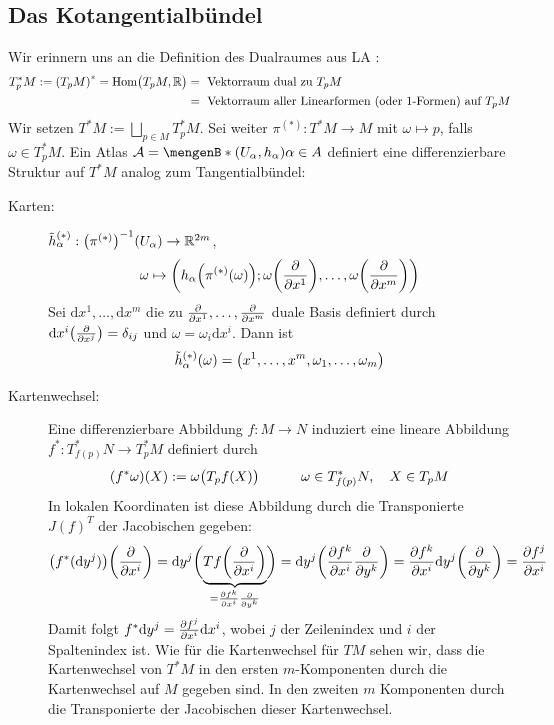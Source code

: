\subsection{Das Kotangentialbündel} %
\label{sub:42}
Wir erinnern uns an die Definition des Dualraumes aus LA :
\begin{align*}
	T_p^* M := \enbrace*{T_pM}^* = \Hom\enbrace[\big]{T_pM, \mathds{R}} &= \text{ Vektorraum dual zu } T_p M  \\
	&= \text{ Vektorraum aller Linearformen (oder 1-Formen) auf } T_pM
\end{align*}
Wir setzen $T^*M := \bigsqcup_{p \in M} T_p^* M$. Sei weiter $\pi^{(*)} : T^*M \to M$ mit $\omega \mapsto p$, falls $\omega \in T_p^* M$. Ein Atlas 
$\mathcal{A} = \set[(U_\alpha, h_\alpha)]{\alpha \in A}$ definiert eine differenzierbare Struktur auf $T^*M$ analog zum Tangentialbündel:
\begin{description}
	\item[Karten:] $\tilde{h}^{(*)}_\alpha : \enbrace*{\pi^{(*)}} ^{-1} (U_\alpha) \to \mathds{R}^{2m}$, 
	\[
		\omega \mapsto \enbrace*{h_\alpha \enbrace*{\pi^{(*)}(\omega)}; \omega \enbrace*{\diff{}{x^1}}, \ldots , \omega \enbrace*{\diff{}{x^m} }   } 
	\]
	Sei $\mathrm{d}x^1, \ldots , \mathrm{d}x^m$ die zu $\diff{}{x^1}, \ldots , \diff{}{x^m}$ duale Basis definiert durch 
	$\mathrm{d}x^i \enbrace*{\diff{}{x^j} } = \delta_{ij} $ und $\omega= \omega_i \mathrm{d}x^i$. Dann ist
	\[
		\tilde{h}_\alpha^{(*)} (\omega) = \enbrace*{x^1, \ldots, x^m, \omega_1, \ldots , \omega_m} 
	\]
	\item[Kartenwechsel:] Eine differenzierbare Abbildung $f : M \to N$ induziert eine lineare Abbildung $f^* : T^*_{f(p)}N \to T^*_pM$ definiert durch 
	\[
		(f^* \omega)(X) := \omega \enbrace[\big]{T_p f(X)} \qquad  \quad \omega \in T_{f(p)}^*N, \quad X \in T_pM
	\]
	In lokalen Koordinaten ist diese Abbildung durch die Transponierte $J(f)^T$ der Jacobischen gegeben:
	\begin{align*}
		\enbrace*{f^*(\mathrm{d}y^j)} \enbrace*{\diff{}{x^i} } = \mathrm{d}y^j \enbrace[\bigg]{\underbrace{T f \enbrace*{\diff{}{x^i} }}_{= \diff{f^k}{x^i} \diff{}{y^k}} } 
		= \mathrm{d}y^j \enbrace*{\diff{f^k}{x^i} \diff{}{y^k}} = \diff{f^k}{x^i} \mathrm{d}y^j \enbrace*{\diff{}{y^k} } = \diff{f^j}{x^i}    
	\end{align*}
	Damit folgt $f^* \mathrm{d}y^j = \diff{f^j}{x^i} \mathrm{d} x^i $, wobei $j$ der Zeilenindex und $i$ der Spaltenindex ist. Wie für die Kartenwechsel für $TM$ sehen wir,
	dass die Kartenwechsel von $T^*M$ in den ersten $m$-Komponenten durch die Kartenwechsel auf $M$ gegeben sind. In den zweiten $m$ Komponenten durch die Transponierte 
	der Jacobischen dieser Kartenwechsel. 
\end{description}

